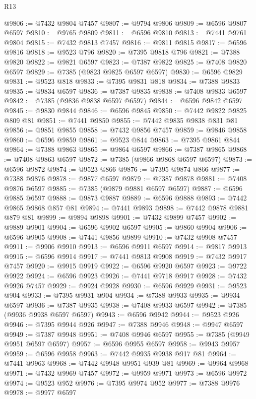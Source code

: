 \begin{lexlean}{R13}
\begin{coremodule}
@9806 := @7432 @9804 @7457
@9807 := @9794 @9806
@9809 := @6596 @9807 @6597
@9810 := @9765 @9809
@9811 := @6596 @9810
@9813 := @7441 @9761 @9804
@9815 := @7432 @9813 @7457
@9816 := @9811 @9815
@9817 := @6596 @9816
@9818 := @9523 @796
@9820 := @7395 @9818 @796
@9821 := @7388 @9820
@9822 := @9821 @6597
@9823 := @7387 @9822
@9825 := @7408 @9820 @6597
@9829 := @7385 (@9823 @9825 @6597 @6597)
@9830 := @6596 @9829
@9831 := @9523 @818
@9833 := @7395 @9831 @818
@9834 := @7388 @9833
@9835 := @9834 @6597
@9836 := @7387 @9835
@9838 := @7408 @9833 @6597
@9842 := @7385 (@9836 @9838 @6597 @6597)
@9844 := @6596 @9842 @6597
@9845 := @9830 @9844
@9846 := @6596 @9845
@9850 := @7442 @9822 @9825 @809 @81
@9851 := @7441 @9850
@9855 := @7442 @9835 @9838 @831 @81
@9856 := @9851 @9855
@9858 := @7432 @9856 @7457
@9859 := @9846 @9858
@9860 := @6596 @9859
@9861 := @9523 @844
@9863 := @7395 @9861 @844
@9864 := @7388 @9863
@9865 := @9864 @6597
@9866 := @7387 @9865
@9868 := @7408 @9863 @6597
@9872 := @7385 (@9866 @9868 @6597 @6597)
@9873 := @6596 @9872
@9874 := @9523 @866
@9876 := @7395 @9874 @866
@9877 := @7388 @9876
@9878 := @9877 @6597
@9879 := @7387 @9878
@9881 := @7408 @9876 @6597
@9885 := @7385 (@9879 @9881 @6597 @6597)
@9887 := @6596 @9885 @6597
@9888 := @9873 @9887
@9889 := @6596 @9888
@9893 := @7442 @9865 @9868 @857 @81
@9894 := @7441 @9893
@9898 := @7442 @9878 @9881 @879 @81
@9899 := @9894 @9898
@9901 := @7432 @9899 @7457
@9902 := @9889 @9901
@9904 := @6596 @9902 @6597
@9905 := @9860 @9904
@9906 := @6596 @9905
@9908 := @7441 @9856 @9899
@9910 := @7432 @9908 @7457
@9911 := @9906 @9910
@9913 := @6596 @9911 @6597
@9914 := @9817 @9913
@9915 := @6596 @9914
@9917 := @7441 @9813 @9908
@9919 := @7432 @9917 @7457
@9920 := @9915 @9919
@9922 := @6596 @9920 @6597
@9923 := @9722 @9922
@9924 := @6596 @9923
@9926 := @7441 @9718 @9917
@9928 := @7432 @9926 @7457
@9929 := @9924 @9928
@9930 := @6596 @9929
@9931 := @9523 @904
@9933 := @7395 @9931 @904
@9934 := @7388 @9933
@9935 := @9934 @6597
@9936 := @7387 @9935
@9938 := @7408 @9933 @6597
@9942 := @7385 (@9936 @9938 @6597 @6597)
@9943 := @6596 @9942
@9944 := @9523 @926
@9946 := @7395 @9944 @926
@9947 := @7388 @9946
@9948 := @9947 @6597
@9949 := @7387 @9948
@9951 := @7408 @9946 @6597
@9955 := @7385 (@9949 @9951 @6597 @6597)
@9957 := @6596 @9955 @6597
@9958 := @9943 @9957
@9959 := @6596 @9958
@9963 := @7442 @9935 @9938 @917 @81
@9964 := @7441 @9963
@9968 := @7442 @9948 @9951 @939 @81
@9969 := @9964 @9968
@9971 := @7432 @9969 @7457
@9972 := @9959 @9971
@9973 := @6596 @9972
@9974 := @9523 @952
@9976 := @7395 @9974 @952
@9977 := @7388 @9976
@9978 := @9977 @6597

\end{coremodule}
\end{lexlean}
